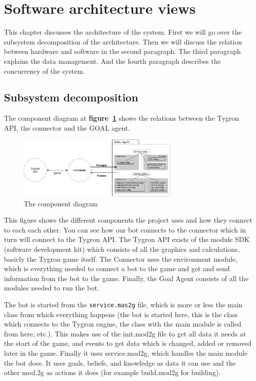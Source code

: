 \label{Software architecture views}
\section{Software architecture views}
This chapter discusses the architecture of the system. First we will go over the subsystem decomposition of the architecture. Then we will discuss the relation between hardware and software in the second paragraph. The third paragraph explains the data management. And the fourth paragraph describes the concurrency of the system.

\subsection{Subsystem decomposition}

The component diagram at \textbf{figure~\ref{fig:comp_diag}} shows the relations between the Tygron API, the connector and the GOAL agent. 

\begin{figure}[h]
	  \centering
	  \includegraphics[width=0.7\textwidth]{system_decomposition}
	  \caption{The component diagram}
	  \label{fig:comp_diag}
\end{figure}
This figure shows the different components the project uses and how they connect to each each other. You can see how our bot connects to the connector which in turn will connect to the Tygron API. The Tygron API exists of the module SDK (software development kit) which consists of all the graphics and calculations, basicly the Tygron game itself. The Connector uses the environment module, which is everything needed to connect a bot to the game and get and send information from the bot to the game. Finally, the Goal Agent consists of all the modules needed to run the bot.

The bot is started from the \texttt{service.mas2g} file, which is more or less the main class from which everything happens (the bot is started here, this is the class which connects to the Tygron engine, the class with the main module is called from here, etc.). This makes use of the init.mod2g file to get all data it needs at the start of the game, and events to get data which is changed, added or removed later in the game. Finally it uses service.mod2g, which handles the main module the bot does. It uses goals, beliefs, and knowledge as data it can use and the other mod.2g as actions it does (for example build.mod2g for building).

